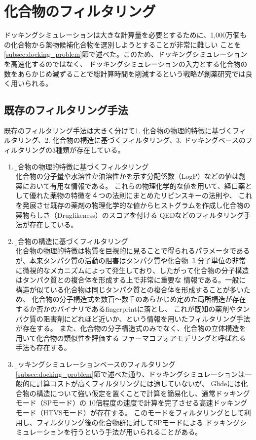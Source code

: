 \section{化合物のフィルタリング}
ドッキングシミュレーションは大きな計算量を必要とするために、1,000万個もの化合物から薬物候補化合物を選別しようとすることが非常に難しい
ことを\ref{subsec:docking_problem}節で述べた。このため、ドッキングシミュレーションを高速化するのではなく、
ドッキングシミュレーションの入力とする化合物の数をあらかじめ減ずることで総計算時間を削減するという戦略が創薬研究では良く用いられる。

\subsection{既存のフィルタリング手法}\label{subsec:existing_filtering}
既存のフィルタリング手法は大きく分けて1. 化合物の物理的特徴に基づくフィルタリング、2. 化合物の構造に基づくフィルタリング、3. ドッキングベースのフィルタリングの3種類が存在している。
\begin{enumerate}
\item \b{化合物の物理的特徴に基づくフィルタリング}\\
化合物の分子量や水溶性か油溶性かを示す分配係数（LogP）などの値は創薬において有用な情報である。
これらの物理化学的な値を用いて、経口薬として優れた薬物の特徴を４つの法則にまとめたリピンスキーの法則\cite{Lipinski1997}や、
これを発展させ既存の薬剤の物理化学的な値からヒストグラムを作成し化合物の薬物らしさ（Druglikeness）のスコアを付ける
QED\cite{Bickerton2012}などのフィルタリング手法が存在している。
\item \b{化合物の構造に基づくフィルタリング}\\
化合物の物理的特徴は物質を巨視的に見ることで得られるパラメータであるが、本来タンパク質の活動の阻害はタンパク質や化合物
１分子単位の非常に微視的なメカニズムによって発生しており、したがって化合物の分子構造はタンパク質との複合体を形成する上で非常に重要な
情報である。一般に構造が似ている化合物は同じタンパク質との複合体を形成することが多いため、
化合物の分子構造式を数百～数千のあらかじめ定めた局所構造が存在するか否かのバイナリであるfingerprintに落とし、
これが既知の薬剤やタンパク質の阻害剤にどれほど近いか、という情報を用いたフィルタリング手法が存在する\cite{Nilakantan1993}。
また、化合物の分子構造式のみでなく、化合物の立体構造を用いて化合物の類似性を評価する
ファーマコフォアモデリングと呼ばれる手法も存在する\cite{Parenti2003}。
\item \b{ドッキングシミュレーションベースのフィルタリング}\\
\ref{subsec:docking_problem}節で述べた通り、ドッキングシミュレーションは一般的に計算コストが高くフィルタリングには適していないが、
Glideには化合物の構造について強い仮定を置くことで計算を簡易化し、通常ドッキングモード（SPモード）の
10倍程度の速度\cite{GlideHomePage}で計算を完了させる高速ドッキングモード（HTVSモード）が存在する。
このモードをフィルタリングとして利用し、フィルタリング後の化合物群に対してSPモードによる
ドッキングシミュレーションを行うという手法が用いられることがある\cite{Fujimoto2008}。
\end{enumerate}

